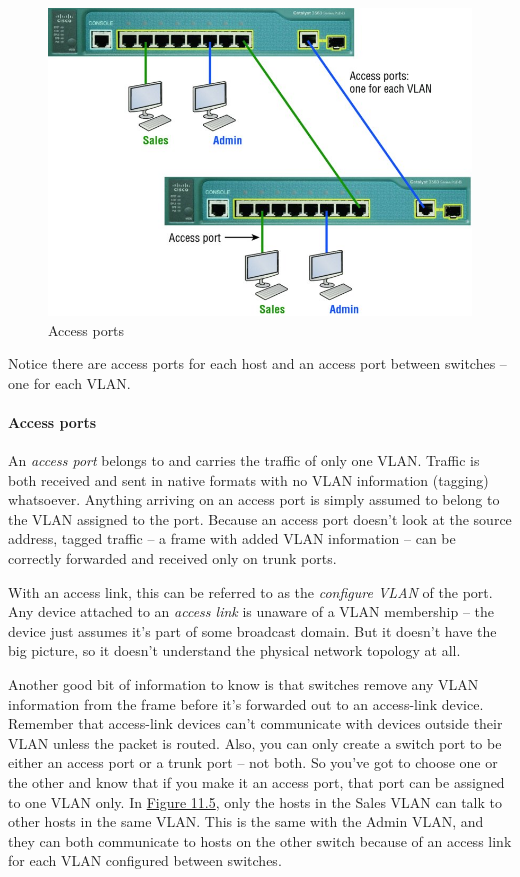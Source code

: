 \begin{figure}
   \centering
   \includegraphics{images/c11f005.jpg}
   \caption{Access ports}
   \label{fig:access-ports}
\end{figure}

Notice there are access ports for each host and an access port between switches -- one for each VLAN.

\paragraph{Access ports}
An \emph{access port} belongs to and carries the traffic of only one VLAN.
Traffic is both received and sent in native formats with no VLAN information (tagging) whatsoever.
Anything arriving on an access port is simply assumed to belong to the VLAN assigned to the port.
Because an access port doesn't look at the source address, tagged traffic -- a frame with added VLAN information -- can be correctly forwarded and received only on trunk ports.

With an access link, this can be referred to as the \emph{configure VLAN} of the port.
Any device attached to an \emph{access link} is unaware of a VLAN membership -- the device just assumes it's part of some
broadcast domain.
But it doesn't have the big picture, so it doesn't understand the physical network topology at all.

Another good bit of information to know is that switches remove any VLAN
information from the frame before it's forwarded out to an access-link
device. Remember that access-link devices can't communicate with devices
outside their VLAN unless the packet is routed. Also, you can only
create a switch port to be either an access port or a trunk port -- not
both. So you've got to choose one or the other and know that if you make
it an access port, that port can be assigned to one VLAN only. In
\protect\hyperlink{c11.xhtmlux5cux23figure11-5}{Figure 11.5}, only the
hosts in the Sales VLAN can talk to other hosts in the same VLAN. This
is the same with the Admin VLAN, and they can both communicate to hosts
on the other switch because of an access link for each VLAN configured
between switches.

